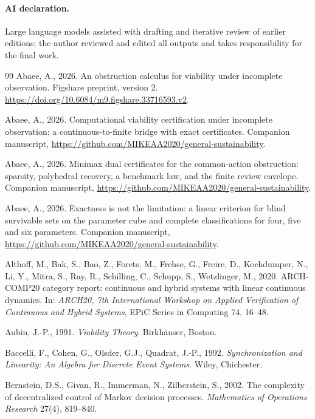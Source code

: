 \paragraph{AI declaration.} Large language models assisted with drafting and iterative review of earlier editions; the author reviewed and edited all outputs and takes responsibility for the final work.

\begin{thebibliography}{99}
\footnotesize
{} Abaee, A., 2026. An obstruction calculus for viability under incomplete observation. Figshare preprint, version 2. \url{https://doi.org/10.6084/m9.figshare.33716593.v2}.

 Abaee, A., 2026. Computational viability certification under incomplete observation: a continuous-to-finite bridge with exact certificates. Companion manuscript, \url{https://github.com/MIKEAA2020/general-sustainability}.

 Abaee, A., 2026. Minimax dual certificates for the common-action obstruction: sparsity, polyhedral recovery, a benchmark law, and the finite review envelope. Companion manuscript, \url{https://github.com/MIKEAA2020/general-sustainability}.

 Abaee, A., 2026. Exactness is not the limitation: a linear criterion for blind survivable sets on the parameter cube and complete classifications for four, five and six parameters. Companion manuscript, \url{https://github.com/MIKEAA2020/general-sustainability}.

 Althoff, M., Bak, S., Bao, Z., Forets, M., Frehse, G., Freire, D., Kochdumper, N., Li, Y., Mitra, S., Ray, R., Schilling, C., Schupp, S., Wetzlinger, M., 2020. ARCH-COMP20 category report: continuous and hybrid systems with linear continuous dynamics. In: \emph{ARCH20, 7th International Workshop on Applied Verification of Continuous and Hybrid Systems}, EPiC Series in Computing 74, 16--48.

 Aubin, J.-P., 1991. \emph{Viability Theory}. Birkh\"auser, Boston.

 Baccelli, F., Cohen, G., Olsder, G.J., Quadrat, J.-P., 1992. \emph{Synchronization and Linearity: An Algebra for Discrete Event Systems}. Wiley, Chichester.

 Bernstein, D.S., Givan, R., Immerman, N., Zilberstein, S., 2002. The complexity of decentralized control of Markov decision processes. \emph{Mathematics of Operations Research} 27(4), 819--840.


\end{thebibliography}
